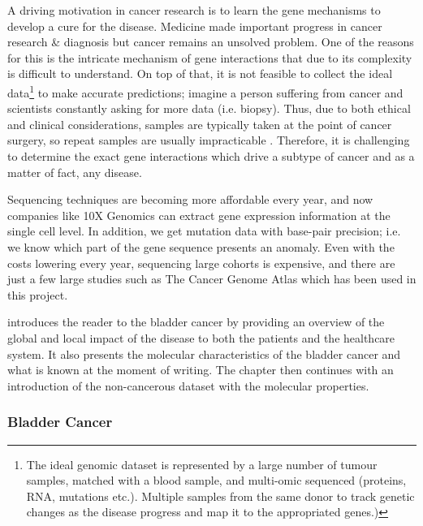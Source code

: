 A driving motivation in cancer research is to learn the gene mechanisms to develop a cure for the disease. Medicine made important progress in cancer research \& diagnosis but cancer remains an unsolved problem. One of the reasons for this is the intricate mechanism of gene interactions that due to its complexity is difficult to understand. On top of that, it is not feasible to collect the ideal data\footnote{The ideal genomic dataset is represented by a large number of tumour samples, matched with a blood sample, and multi-omic sequenced (proteins, RNA, mutations etc.). Multiple samples from the same donor to track genetic changes as the disease progress and map it to the appropriated genes.)} to make accurate predictions; imagine a person suffering from cancer and scientists constantly asking for more data (i.e. biopsy). Thus, due to both ethical and clinical considerations, samples are typically taken at the point of cancer surgery, so repeat samples are usually impracticable . Therefore, it is challenging to determine the exact gene interactions which drive a subtype of cancer and as a matter of fact, any disease. 

Sequencing techniques are becoming more affordable every year, and now companies like 10X Genomics can extract gene expression information at the single cell level. In addition, we get mutation data with base-pair precision; i.e. we know which part of the gene sequence presents an anomaly. Even with the costs lowering every year, sequencing large cohorts is expensive, and there are just a few large studies such as The Cancer Genome Atlas which has been used in this project.

 introduces the reader to the bladder cancer by providing an overview of the global and local impact of the disease to both the patients and the healthcare system. It also presents the molecular characteristics of the bladder cancer and what is known at the moment of writing. The chapter then continues with an introduction of the non-cancerous dataset with the molecular properties.

\subsubsection{Bladder Cancer} \label{s:lit:bladder_cancer}


